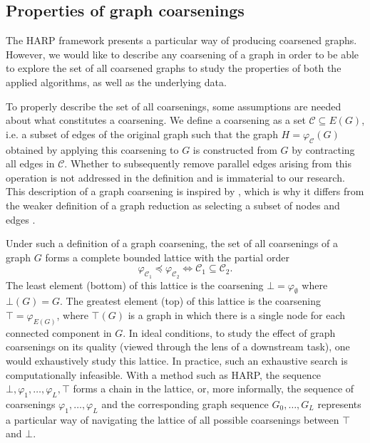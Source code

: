 \subsection{Properties of graph coarsenings}\label{sec:coarsening-properties}

The HARP framework presents a particular way of producing coarsened graphs. However, we would like to describe any coarsening of a graph in order to be able to explore the set of all coarsened graphs to study the properties of both the applied algorithms, as well as the underlying data.

To properly describe the set of all coarsenings, some assumptions are needed about what constitutes a coarsening. We define a coarsening as a set \( \mathcal{C} \subseteq E \left( G \right) \), i.e. a subset of edges of the original graph such that the graph \( H = \varphi_\mathcal{C} \left( G \right) \) obtained by applying this coarsening to \( G \) is constructed from \( G \) by contracting all edges in \( \mathcal{C} \). Whether to subsequently remove parallel edges arising from this operation is not addressed in the definition and is immaterial to our research. This description of a graph coarsening is inspired by \cite{schulz_mining_2019}, which is why it differs from the weaker definition of a graph reduction as selecting a subset of nodes and edges \cite{huang_scaling_2021,loukas_graph_2019}.

Under such a definition of a graph coarsening, the set of all coarsenings of a graph \( G \) forms a complete bounded lattice with the partial order
\[ \varphi_{\mathcal{C}_1} \preceq \varphi_{\mathcal{C}_2} \iff \mathcal{C}_1 \subseteq \mathcal{C}_2. \]
The least element (bottom) of this lattice is the coarsening \( \bot = \varphi_\emptyset \) where \( \bot \left( G \right) = G \). The greatest element (top) of this lattice is the coarsening \( \top = \varphi_{E \left( G \right)} \), where \( \top \left( G \right) \) is a graph in which there is a single node for each connected component in \( G \). In ideal conditions, to study the effect of graph coarsenings on its quality (viewed through the lens of a downstream task), one would exhaustively study this lattice. In practice, such an exhaustive search is computationally infeasible. With a method such as HARP, the sequence \( \bot, \varphi_1, \dots, \varphi_L, \top \) forms a chain in the lattice, or, more informally, the sequence of coarsenings \( \varphi_1, \dots, \varphi_L \) and the corresponding graph sequence \( G_0, \dots, G_L \) represents a particular way of navigating the lattice of all possible coarsenings between \( \top \) and \( \bot \).
